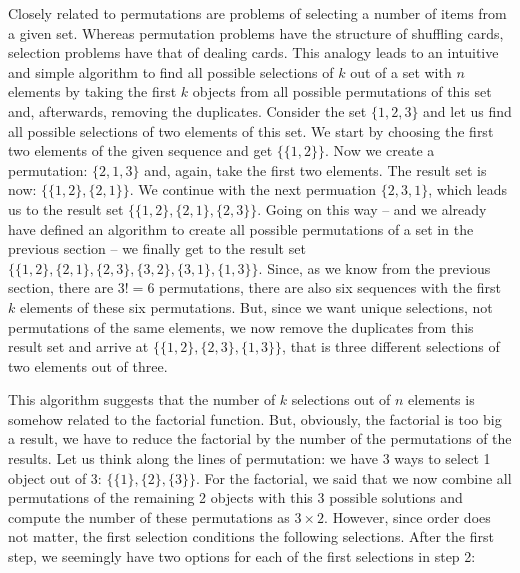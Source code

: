 \documentclass{scrreprt}
\begin{document}
Closely related to permutations
are problems of selecting a number of items
from a given set.
Whereas 
permutation problems have the structure of
shuffling cards,
selection problems have that of dealing cards.
This analogy
leads to an intuitive and simple algorithm
to find all possible selections of 
$k$ out of a set with $n$ elements by taking
the first $k$ objects from all possible
permutations of this set
and, afterwards, removing the duplicates.
Consider the set $\lbrace 1,2,3\rbrace$ and
let us find all possible selections
of two elements of this set.
We start by choosing 
the first two elements of 
the given sequence and get 
$\lbrace\lbrace 1,2\rbrace\rbrace$.
Now we create a permutation: $\lbrace 2,1,3\rbrace$
and, again, take the first two elements.
The result set is now: 
$\lbrace \lbrace 1,2\rbrace,\lbrace 2,1\rbrace\rbrace$.
We continue with the next permuation
$\lbrace 2,3,1\rbrace$, which leads us to the result set
$\lbrace 
 \lbrace 1,2\rbrace, 
 \lbrace 2,1\rbrace, 
 \lbrace 2,3\rbrace\rbrace$.
Going on this way --
and we already have defined an algorithm
to create all possible permutations of a set
in the previous section --
we finally get to the result set 
$\lbrace 
 \lbrace 1,2\rbrace, \lbrace 2,1\rbrace, 
 \lbrace 2,3\rbrace, \lbrace 3,2\rbrace,
 \lbrace 3,1\rbrace, \lbrace 1,3\rbrace\rbrace$.
Since, as we know from the previous section,
there are $3! = 6$ permutations,
there are also six sequences with the first $k$ elements
of these six permutations.
But, since we want unique selections,
not permutations of the same elements,
we now remove the duplicates from this result set
and arrive at
$\lbrace
 \lbrace 1,2\rbrace,
 \lbrace 2,3\rbrace,
 \lbrace 1,3\rbrace\rbrace$,
that is three different selections 
of two elements out of three.

This algorithm suggests
that the number of $k$ selections out of $n$ elements
is somehow related to the factorial function.
But, obviously, the factorial is too big a result,
we have to reduce the factorial 
by the number of the permutations of the results.
Let us think along the lines of permutation:
we have 3 ways to select 1 object out of 3:
$\lbrace
 \lbrace 1\rbrace, 
 \lbrace 2\rbrace,
 \lbrace 3\rbrace\rbrace$.
For the factorial,
we said that we now combine 
all permutations of the remaining 2 objects
with this 3 possible solutions 
and compute the number of these permutations as $3 \times 2$.
However, since order does not matter,
the first selection conditions the following selections.
After the first step, we seemingly have two options 
for each of the first selections in step 2:
\end{document}
